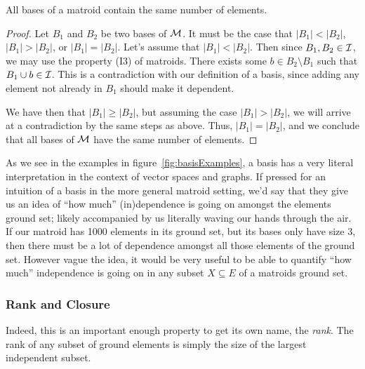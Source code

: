 \documentclass[12pt,oneside]{../../sfsuthesis}
\begin{document}
\begin{proposition}\th\label{thm:basesSameSize}
    All bases of a matroid contain the same number of elements.
\end{proposition}

\begin{proof}
    Let \( B_1 \) and \( B_2 \) be two bases of \( \mathcal{M} \).
    It must be the case that  \( |B_1| < |B_2| \), \( |B_1| > |B_2| \), or \( |B_1| = |B_2| \).
    Let's assume that  \( |B_1| < |B_2| \).
    Then since \( B_1, B_2 \in \mathcal{I} \), we may use the property (I3) of matroids.
    There exists some \( b \in B_2 \setminus B_1 \) such that \( B_1 \cup b \in \mathcal{I} \).
    This is a contradiction with our definition of a basis, since adding any element not already in \( B_1 \) should make it dependent.


    We have then that \( |B_1| \geq |B_2| \), but assuming the case \( |B_1| > |B_2| \), we will arrive at a contradiction by the same steps as above.
    Thus, \( |B_1| = |B_2| \), and we conclude that all bases of \( \mathcal{M} \) have the same number of elements.
\end{proof}

As we see in the examples in figure~\ref{fig:basisExamples}, a basis has a very literal interpretation in the context of vector spaces and graphs.
If pressed for an intuition of a basis in the more general matroid setting, we'd say that they give us an idea of ``how much'' (in)dependence is going on amongst the elements ground set; likely accompanied by us literally waving our hands through the air.
If our matroid has 1000 elements in its ground set, but its bases only have size 3, then there must be a lot of dependence amongst all those elements of the ground set.
However vague the idea, it would be very useful to be able to quantify ``how much'' independence is going on in any subset \( X \subseteq E \) of a matroids ground set.

\subsubsection{Rank and Closure}

Indeed, this is an important enough property to get its own name, the \emph{rank}.
The rank of any subset of ground elements is simply the size of the largest independent subset.
\end{document}
